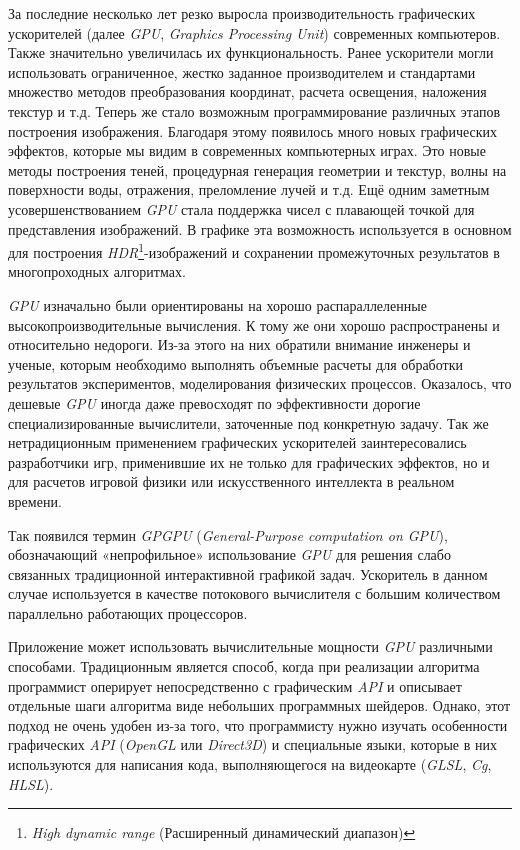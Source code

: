 \documentclass[a4paper,14pt]{extreport}
\begin{document}
За последние несколько лет резко выросла производительность графических ускорителей (далее \emph{GPU}, \emph{Graphics Processing Unit}) современных компьютеров. Также значительно увеличилась их функциональность. Ранее ускорители могли использовать ограниченное, жестко заданное производителем и стандартами множество методов преобразования координат, расчета освещения, наложения текстур и т.д. Теперь же стало возможным программирование различных этапов построения изображения. Благодаря этому появилось много новых графических эффектов, которые мы видим в современных компьютерных играх. Это новые методы построения теней, процедурная генерация геометрии и текстур, волны на поверхности воды, отражения, преломление лучей и т.д. Ещё одним заметным усовершенствованием \emph{GPU} стала поддержка чисел с плавающей точкой для представления изображений. В графике эта возможность используется в основном для построения \emph{HDR}\footnote{\emph{High dynamic range} (Расширенный динамический диапазон)}-изображений и сохранении промежуточных результатов в многопроходных алгоритмах.

\emph{GPU} изначально были ориентированы на хорошо распараллеленные высокопроизводительные вычисления. К тому же они хорошо распространены и относительно недороги. Из-за этого на них обратили внимание инженеры и ученые, которым необходимо выполнять объемные расчеты для обработки результатов экспериментов, моделирования физических процессов. Оказалось, что дешевые \emph{GPU} иногда даже превосходят по эффективности дорогие специализированные вычислители, заточенные под конкретную задачу. Так же нетрадиционным применением графических ускорителей заинтересовались разработчики игр, применившие их не только для графических эффектов, но и для расчетов игровой физики или искусственного интеллекта в реальном времени.

Так появился термин \emph{GPGPU} (\emph{General-Purpose computation on GPU}), обозначающий «непрофильное» использование \emph{GPU} для решения слабо связанных традиционной интерактивной графикой задач. Ускоритель в данном случае используется в качестве потокового вычислителя с большим количеством параллельно работающих процессоров.

Приложение может использовать вычислительные мощности \emph{GPU} различными способами. Традиционным является способ, когда при реализации алгоритма программист оперирует непосредственно с графическим \emph{API} и описывает отдельные шаги алгоритма виде небольших программных шейдеров. Однако, этот подход не очень удобен из-за того, что программисту нужно изучать особенности графических \emph{API} (\emph{OpenGL} или \emph{Direct3D}) и специальные языки, которые в них используются для написания кода, выполняющегося на видеокарте (\emph{GLSL}, \emph{Cg}\cite{cg:2005}, \emph{HLSL}).
\end{document}
